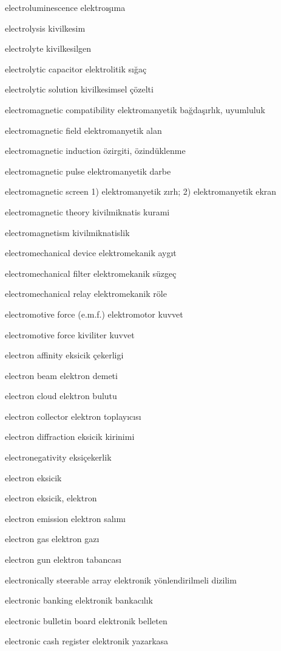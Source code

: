 \documentclass[12pt,fleqn]{article}\usepackage{../../common}
\begin{document}
electroluminescence elektroışıma

electrolysis kivilkesim

electrolyte kivilkesilgen

electrolytic capacitor elektrolitik sığaç

electrolytic solution kivilkesimsel çözelti

electromagnetic compatibility elektromanyetik bağdaşırlık, uyumluluk

electromagnetic field elektromanyetik alan

electromagnetic induction özirgiti, özindüklenme

electromagnetic pulse elektromanyetik darbe

electromagnetic screen 1) elektromanyetik zırh; 2) elektromanyetik ekran

electromagnetic theory kivilmiknatis kurami

electromagnetism kivilmiknatislik

electromechanical device elektromekanik aygıt

electromechanical filter elektromekanik süzgeç

electromechanical relay elektromekanik röle

electromotive force (e.m.f.) elektromotor kuvvet

electromotive force kiviliter kuvvet

electron affinity eksicik çekerligi

electron beam elektron demeti

electron cloud elektron bulutu

electron collector elektron toplayıcısı

electron diffraction eksicik kirinimi

electronegativity eksiçekerlik

electron eksicik

electron eksicik, elektron

electron emission elektron salımı

electron gas elektron gazı

electron gun elektron tabancası

electronically steerable array elektronik yönlendirilmeli dizilim

electronic banking elektronik bankacılık

electronic bulletin board elektronik belleten

electronic cash register elektronik yazarkasa
\end{document}
